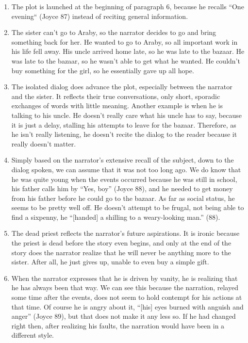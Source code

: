 \documentclass[12pt,letterpaper]{article}
\begin{document}
\begin{enumerate}

\item The plot is launched at the beginning of paragraph 6, because he recalls
``One evening`` (Joyce 87) instead of reciting general information.

\item The sister can't go to Araby, so the narrator decides to go and bring
something back for her.  He wanted to go to Araby, so all important work in his
life fell away.  His uncle arrived home late, so he was late to the bazaar.  He
was late to the bazaar, so he wasn't able to get what he wanted.  He couldn't
buy something for the girl, so he essentially gave up all hope.

\item The isolated dialog does advance the plot, especially between the narrator
and the sister.  It reflects their true conversations, only short, sporadic
exchanges of words with little meaning.  Another example is when he is talking
to his uncle.  He doesn't really care what his uncle has to say, because it is
just a delay, stalling his attempts to leave for the bazaar.  Therefore, as he
isn't really listening, he doesn't recite the dialog to the reader because it
really doesn't matter.

\item Simply based on the narrator's extensive recall of the subject, down to
the dialog spoken, we can assume that it was not too long ago.  We do know that
he was quite young when the events occurred because he was still in school, his
father calls him by ``Yes, boy'' (Joyce 88), and he needed to get money from his
father before he could go to the bazaar.  As far as social status, he seems to
be pretty well off.  He doesn't attempt to be frugal, not being able to find a
sixpenny, he ``[handed] a shilling to a weary-looking man.'' (88).

\item The dead priest reflects the narrator's future aspirations.  It is ironic
because the priest is dead before the story even begins, and only at the end of
the story does the narrator realize that he will never be anything more to the
sister.  After all, he just gives up, unable to even buy a simple gift.

\item When the narrator expresses that he is driven by vanity, he is realizing
that he has always been that way.  We can see this because the narration,
relayed some time after the events, does not seem to hold contempt for his
actions at that time.  Of course he is angry about it, ``[his] eyes burned with
anguish and anger'' (Joyce 89), but that does not make it any less so.  If he
had changed right then, after realizing his faults, the narration would have
been in a different style.

\end{enumerate}
\end{document}
